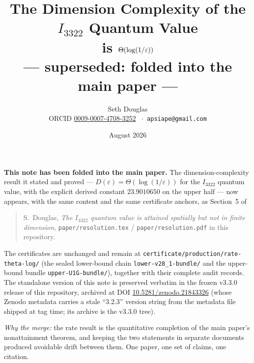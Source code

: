 \documentclass[11pt]{article}
\title{The Dimension Complexity of the $I_{3322}$ Quantum Value\\
is \texorpdfstring{$\Theta(\log(1/\eps))$}{Theta(log(1/eps))}\\[1ex]
\large --- superseded: folded into the main paper ---}
\author{Seth Douglas\\
\small ORCID \href{https://orcid.org/0009-0007-4708-3252}{0009-0007-4708-3252}
\ $\cdot$\ \texttt{apsiape@gmail.com}}
\date{August 2026}
\newcommand{\eps}{\varepsilon}
\begin{document}
\maketitle

\noindent\textbf{This note has been folded into the main paper.} The
dimension-complexity result it stated and proved ---
$D(\eps)=\Theta(\log(1/\eps))$ for the $I_{3322}$ quantum value, with the
explicit derived constant $23.9010650$ on the upper half --- now appears,
with the same content and the same certificate anchors, as
Section~5 of
\begin{quote}
S.~Douglas, \emph{The $I_{3322}$ quantum value is attained spatially but
not in finite dimension}, \texttt{paper/resolution.tex} /
\texttt{paper/resolution.pdf} in this repository.
\end{quote}

\noindent The certificates are unchanged and remain at
\texttt{certificate/production/rate-theta-log/} (the sealed lower-bound
chain \texttt{lower-v28\_1-bundle/} and the upper-bound bundle
\texttt{upper-U1G-bundle/}), together with their complete audit records.
The standalone version of this note is preserved verbatim in the frozen
v3.3.0 release of this repository, archived at DOI
\href{https://doi.org/10.5281/zenodo.21843326}{10.5281/zenodo.21843326}
(whose Zenodo metadata carries a stale ``3.2.3'' version string from the
metadata file shipped at tag time; its archive is the v3.3.0 tree).

\medskip
\noindent\emph{Why the merge:} the rate result is the quantitative
completion of the main paper's nonattainment theorem, and keeping the two
statements in separate documents produced avoidable drift between them.
One paper, one set of claims, one citation.
\end{document}
